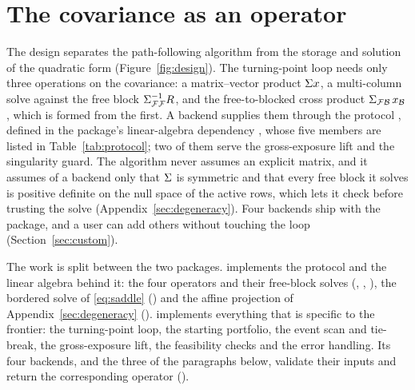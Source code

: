 \section{The covariance as an operator}
\label{sec:operators}

The design separates the path-following algorithm from the storage and solution of the
quadratic form (Figure~\ref{fig:design}). The turning-point loop needs only three
operations on the covariance: a matrix--vector product $\Sigma x$, a multi-column solve
against the free block $\Sigma_{\mathcal{F}\mathcal{F}}^{-1} R$, and the free-to-blocked cross product
$\Sigma_{\mathcal{F}\mathcal{B}}\,x_{\mathcal{B}}$, which is formed from the first. A backend supplies them through the
protocol , defined in the package's linear-algebra dependency
 \citep{cvxlinalg}, whose five members are listed in
Table~\ref{tab:protocol}; two of them serve the gross-exposure lift and the singularity
guard. The algorithm never assumes an explicit matrix, and it assumes of a backend only
that $\Sigma$ is symmetric and that every free block it solves is positive definite on
the null space of the active rows, which  lets it check before
trusting the solve (Appendix~\ref{sec:degeneracy}). Four backends ship with the package, and a user can add
others without touching the loop (Section~\ref{sec:custom}).

The work is split between the two packages.  implements the protocol and
the linear algebra behind it: the four operators and their free-block solves
(,
,
), the bordered solve of
\eqref{eq:saddle} () and the
affine projection of Appendix~\ref{sec:degeneracy}
().  implements
everything that is specific to the frontier: the turning-point loop, the starting
portfolio, the event scan and tie-break, the gross-exposure lift, the feasibility checks
and the error handling. Its four backends,  and the three of the paragraphs
below, validate their inputs and return the corresponding  operator
().

